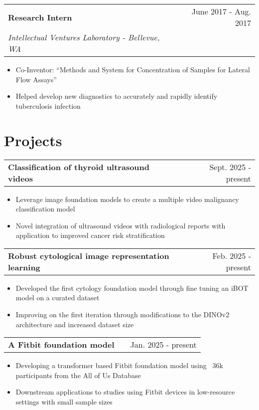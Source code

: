 \documentclass[a4paper,12pt]{article}
\makeatletter
\newenvironment{joblong}[3]
    {
    \begin{tabularx}{\linewidth}{@{}l X r@{}}
    \textbf{#1} & \hfill &  #2 \\
    \textit{#3} & & \\[3.75pt]  
    \end{tabularx}
    \begin{minipage}[t]{\linewidth}
    \begin{itemize}[nosep,after=\strut, leftmargin=1em, itemsep=3pt,label=\scriptsize$\bullet$]
    }
    {
    \end{itemize}
    \end{minipage}    
    }
\newenvironment{projectlong}[2]
    {
    \begin{tabularx}{\linewidth}{@{}l X r@{}}
    \textbf{#1} & \hfill &  #2 \\
    \end{tabularx}
    \begin{minipage}[t]{\linewidth}
    \begin{itemize}[nosep,after=\strut, leftmargin=1em, itemsep=3pt,label=\scriptsize$\bullet$]
    }
    {
    \end{itemize}
    \end{minipage}    
    }
\makeatother
\begin{document}
\begin{joblong}{Research Intern}{June 2017 - Aug. 2017}{Intellectual Ventures Laboratory - Bellevue, WA}
\item Co-Inventor: “Methods and System for Concentration of Samples for Lateral Flow Assays”
\item Helped develop new diagnostics to accurately and rapidly identify tuberculosis infection
\end{joblong}



\section{Projects}

\begin{projectlong}{Classification of thyroid ultrasound videos}{Sept. 2025 - present}
    \item Leverage image foundation models to create a multiple video malignancy classification model
    \item Novel integration of ultrasound videos with radiological reports with application to improved cancer risk stratification
\end{projectlong}

\begin{projectlong}{Robust cytological image representation learning}{Feb. 2025 - present}
    \item Developed the first cytology foundation model through fine tuning an iBOT model on a curated dataset
    \item Improving on the first iteration through modifications to the DINOv2 architecture and increased dataset size
\end{projectlong}

\begin{projectlong}{A Fitbit foundation model}{Jan. 2025 - present}
    \item Developing a transformer based Fitbit foundation model using ~36k participants from the All of Us Database
    \item Downstream applications to studies using Fitbit devices in low-resource settings with small sample sizes
\end{projectlong}

\end{document}
